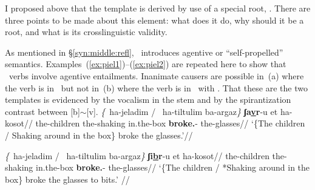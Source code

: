 I proposed above that the template {\tpie} is derived by use of a special root, \va. There are three points to be made about this element: what does it do, why should it be a root, and what is its crosslinguistic validity.

As mentioned in \S\ref{syn:middle:refl}, \va~introduces agentive or ``self-propelled'' \citep{folliharley08} semantics. Examples~(\ref{ex:piel1})--(\ref{ex:piel2}) are repeated here to show that \tpie~verbs involve agentive entailments. Inanimate causers are possible in~(\nextx a) where the verb is in \tkal~but not in~(\nextx b) where the verb is in \tpie~with \va. That these are the two templates is evidenced by the vocalism in the stem and by the spirantization contrast between [b]$\sim$[v].
\pex
	\a \begingl
		\gla \emph{\{}\cmark~ha-jeladim / \cmark~ha-tiltulim ba-argaz\emph{\}} \textbf{ʃa\underline{v}r}-u et ha-kosot//
		\glb \phantom{\{\cmark~}the-children {} \phantom{\cmark~}the-shaking in.the-box \textbf{broke.}-  the-glasses//
		\glft `\{The children / Shaking around in the box\} broke the glasses.'//
		\endgl
	
	\a \begingl
		\gla \emph{\{}\cmark~ha-jeladim / \xmark~ha-tiltulim ba-argaz\emph{\}} \textbf{ʃi\underline{b}r}-u et ha-kosot//
		\glb \phantom{\{\cmark~}the-children {} \phantom{\xmark~}the-shaking in.the-box \textbf{broke.}-  the-glasses//
		\glft `\{The children / *Shaking around in the box\} broke the glasses to bits.' //
		\endgl
\xe

